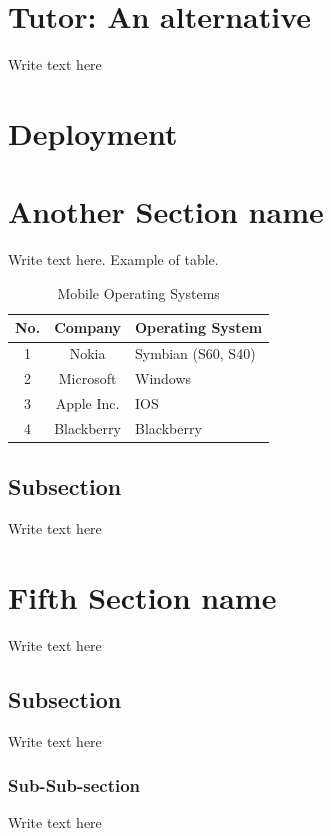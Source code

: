 \documentclass[12pt]{article}
\begin{document}
\section{Tutor: An alternative}
Write text here

\section{Deployment}
\pagebreak

\section{Another Section name}
Write text here. Example of table.
\begin{table}[H]
\begin{center}
\begin{tabular}{|c|c|p{4cm}|}
 \hline
 \textbf{No.} & \textbf{Company} & \textbf{Operating System} \\
 \hline
 1 & Nokia & Symbian (S60, S40) \\
 \hline
 2 & Microsoft & Windows \\
 \hline
 3 & Apple Inc. & IOS \\
 \hline
 4 & Blackberry & Blackberry \\
 \hline
\end{tabular}
 \caption{Mobile Operating Systems}
 \end{center}
\end{table}

\subsection{Subsection}
Write text here


\section{Fifth Section name}
Write text here

\subsection{Subsection}
Write text here

\subsubsection{Sub-Sub-section}
Write text here



\end{document}
